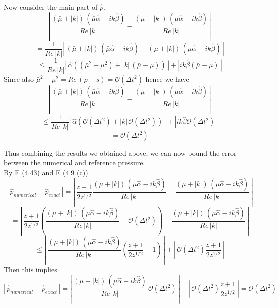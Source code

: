 Now consider the main part of $\hat{p}$.
\begin{equation*}
|\,\dfrac{(\bar{\mu} + |k|)\,(\bar{\mu} \hat{\alpha}  -ik \hat{\beta})}{Re\,|k|} - \dfrac{(\mu + |k|)\,(\mu \hat{\alpha}  -ik \hat{\beta})}{Re\,|k|}\,|
\end{equation*}
\begin{equation*}
= \dfrac{1}{Re\,|k|}|\,(\bar{\mu} + |k|)\,(\bar{\mu} \hat{\alpha}  -ik \hat{\beta}) - (\mu + |k|)\,(\mu \hat{\alpha}  -ik \hat{\beta})\,|
\end{equation*}
\begin{equation*}
\leq \dfrac{1}{Re\,|k|}|\,\hat{\alpha}((\bar{\mu}^2 - \mu^2) + |k|\,(\bar{\mu} -\mu))\,| + |ik \hat{\beta} ( \bar{\mu} - \mu)\,|
\end{equation*}
Since also $\bar{\mu}^2 - \mu^2 = Re\,(\rho - s) = \mathcal{O} (\Delta t^2)$ hence we have
\begin{equation*}
|\,\dfrac{(\bar{\mu} + |k|)\,(\bar{\mu} \hat{\alpha}  -ik \hat{\beta})}{Re\,|k|} - \dfrac{(\mu + |k|)\,(\mu \hat{\alpha}  -ik \hat{\beta})}{Re\,|k|}\,|
\end{equation*}
\begin{equation*}
\leq \dfrac{1}{Re\,|k|}|\,\hat{\alpha}(\mathcal{O} (\Delta t^2) + |k|\,\mathcal{O} (\Delta t^2))\,| + |ik \hat{\beta} \mathcal{O} (\Delta t^2)\,|
\end{equation*}
\begin{equation}
=  \mathcal{O} (\Delta t^2)
\end{equation}

Thus combining the results we obtained above, we can now bound the error between the numerical and reference pressure.\\
By E (4.43) and E (4.9 (c))
\begin{equation*}
|\,\hat{p}_{numerical} - \hat{p}_{exact}\,| =|\, \dfrac{z+1}{2 z^{1/2}} \dfrac{(\bar{\mu} + |k|)\,(\bar{\mu} \hat{\alpha}  -ik \hat{\beta})}{Re\,|k|} - \dfrac{(\mu + |k|)\,(\mu \hat{\alpha}  -ik \hat{\beta})}{Re\,|k|}\,|
\end{equation*}
\begin{equation*}
= |\, \dfrac{z+1}{2 z^{1/2}} (\dfrac{(\mu + |k|)\,(\mu \hat{\alpha}  -ik \hat{\beta})}{Re\,|k|} + \mathcal{O} (\Delta t^2)) - \dfrac{(\mu + |k|)\,(\mu \hat{\alpha}  -ik \hat{\beta})}{Re\,|k|}\,|
\end{equation*}
\begin{equation*}
\leq  |\, \dfrac{(\mu + |k|)\,(\mu \hat{\alpha}  -ik \hat{\beta})}{Re\,|k|}(\dfrac{z+1}{2 z^{1/2}} - 1)\,| + |\,\mathcal{O} (\Delta t^2)\dfrac{z+1}{2 z^{1/2}}\,|
\end{equation*}
Then this implies
\begin{equation}
|\,\hat{p}_{numerical} - \hat{p}_{exact}\,| =  |\, \dfrac{(\mu + |k|)\,(\mu \hat{\alpha}  -ik \hat{\beta})}{Re\,|k|}\,\mathcal{O} (\Delta t^2)\,| + |\,\mathcal{O} (\Delta t^2)\dfrac{z+1}{2 z^{1/2}}\,| = \mathcal{O} (\Delta t^2)
\end{equation}

